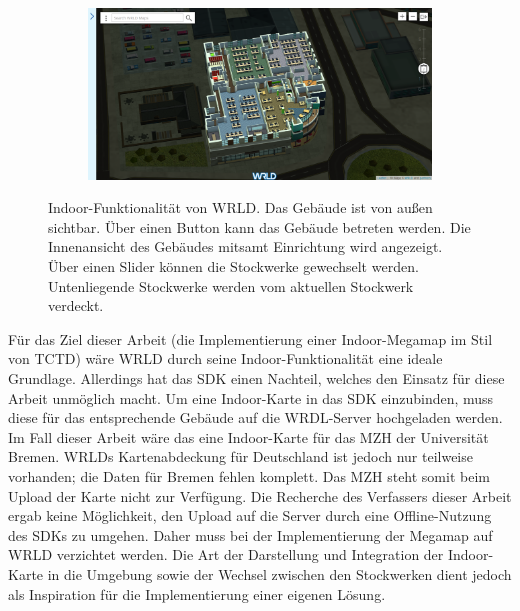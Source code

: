 \begin{figure}[t]
\begin{subfigure}{0.49\textwidth}
        \caption{}
        \label{sfig:wrld_indoor_transition}
    \end{subfigure}
    \hfill
    \begin{subfigure}{0.49\textwidth}
        \includegraphics[width=\textwidth]{figures/wrdl_indoor_2.png}
        \caption{}
        \label{sfig:wrld_indoor_2}
    \end{subfigure}
    \caption{Indoor-Funktionalität von WRLD.\@ %
         Das Gebäude ist von außen sichtbar. %
        Über einen Button kann das Gebäude betreten werden. %
         Die Innenansicht des Gebäudes mitsamt Einrichtung wird angezeigt. %
         Über einen Slider können die Stockwerke gewechselt werden. %
         Untenliegende Stockwerke werden vom aktuellen Stockwerk verdeckt.%
    }
    \label{fig:wrld_indoor}
\end{figure}

Für das Ziel dieser Arbeit (die Implementierung einer Indoor-Megamap im Stil von TCTD) wäre WRLD durch seine Indoor-Funktionalität eine ideale Grundlage.
Allerdings hat das SDK einen Nachteil, welches den Einsatz für diese Arbeit unmöglich macht.
Um eine Indoor-Karte in das SDK einzubinden, muss diese für das entsprechende Gebäude auf die WRDL-Server hochgeladen werden.
Im Fall dieser Arbeit wäre das eine Indoor-Karte für das MZH der Universität Bremen.
WRLDs Kartenabdeckung für Deutschland ist jedoch nur teilweise vorhanden; die Daten für Bremen fehlen komplett.
Das MZH steht somit beim Upload der Karte nicht zur Verfügung.
Die Recherche des Verfassers dieser Arbeit ergab keine Möglichkeit, den Upload auf die Server durch eine Offline-Nutzung des SDKs zu umgehen.
Daher muss bei der Implementierung der Megamap auf WRLD verzichtet werden.
Die Art der Darstellung und Integration der Indoor-Karte in die Umgebung sowie der Wechsel zwischen den Stockwerken dient jedoch als Inspiration für die Implementierung einer eigenen Lösung.

